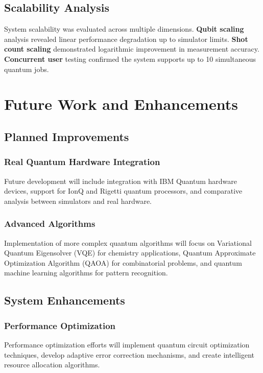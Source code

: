 \documentclass[onecolumn]{IEEEtran}
\begin{document}
\subsection{Scalability Analysis}

System scalability was evaluated across multiple dimensions. \textbf{Qubit scaling} analysis revealed linear performance degradation up to simulator limits. \textbf{Shot count scaling} demonstrated logarithmic improvement in measurement accuracy. \textbf{Concurrent user} testing confirmed the system supports up to 10 simultaneous quantum jobs.

\section{Future Work and Enhancements}

\subsection{Planned Improvements}

\subsubsection{Real Quantum Hardware Integration}
Future development will include integration with IBM Quantum hardware devices, support for IonQ and Rigetti quantum processors, and comparative analysis between simulators and real hardware.

\subsubsection{Advanced Algorithms}
Implementation of more complex quantum algorithms will focus on Variational Quantum Eigensolver (VQE) for chemistry applications, Quantum Approximate Optimization Algorithm (QAOA) for combinatorial problems, and quantum machine learning algorithms for pattern recognition.

\subsection{System Enhancements}

\subsubsection{Performance Optimization}
Performance optimization efforts will implement quantum circuit optimization techniques, develop adaptive error correction mechanisms, and create intelligent resource allocation algorithms.
\end{document}
